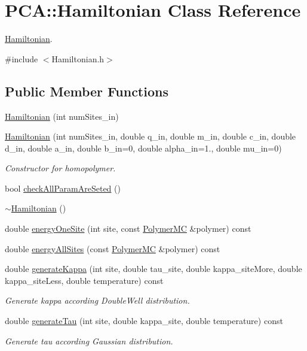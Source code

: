 \hypertarget{class_p_c_a_1_1_hamiltonian}{}\section{P\+CA\+:\+:Hamiltonian Class Reference}
\label{class_p_c_a_1_1_hamiltonian}


\hyperlink{class_p_c_a_1_1_hamiltonian}{Hamiltonian}.  




{\ttfamily \#include $<$Hamiltonian.\+h$>$}

\subsection*{Public Member Functions}
\begin{DoxyCompactItemize}
\item 
\hyperlink{class_p_c_a_1_1_hamiltonian_a3010d0e945bf871c22e57d530783c02a}{Hamiltonian} (int num\+Sites\+\_\+in)
\item 
\hyperlink{class_p_c_a_1_1_hamiltonian_ad2663a98cb52b4675ed01d6b911dd45a}{Hamiltonian} (int num\+Sites\+\_\+in, double q\+\_\+in, double m\+\_\+in, double c\+\_\+in, double d\+\_\+in, double a\+\_\+in, double b\+\_\+in=0, double alpha\+\_\+in=1., double mu\+\_\+in=0)
\begin{DoxyCompactList}\small\item\em Constructor for homopolymer. \end{DoxyCompactList}\item 
bool \hyperlink{class_p_c_a_1_1_hamiltonian_a3c9bddc6635c2a5a2ba0b2956126eb79}{check\+All\+Param\+Are\+Seted} ()
\item 
\hyperlink{class_p_c_a_1_1_hamiltonian_a87dcca06e1580312d8ffd4ef7fcad219}{$\sim$\+Hamiltonian} ()
\item 
double \hyperlink{class_p_c_a_1_1_hamiltonian_aaf2a99fc482ccd2ebb0dc671f1a8df5a}{energy\+One\+Site} (int site, const \hyperlink{class_p_c_a_1_1_polymer_m_c}{Polymer\+MC} \&polymer) const
\item 
double \hyperlink{class_p_c_a_1_1_hamiltonian_a0751ca31444a5de38e6e5d7d07843538}{energy\+All\+Sites} (const \hyperlink{class_p_c_a_1_1_polymer_m_c}{Polymer\+MC} \&polymer) const
\item 
double \hyperlink{class_p_c_a_1_1_hamiltonian_a89970a467d0ca05c41361fdd349a9ec7}{generate\+Kappa} (int site, double tau\+\_\+site, double kappa\+\_\+site\+More, double kappa\+\_\+site\+Less, double temperature) const
\begin{DoxyCompactList}\small\item\em Generate kappa according Double\+Well distribution. \end{DoxyCompactList}\item 
double \hyperlink{class_p_c_a_1_1_hamiltonian_a4da405a227d850e6e50c87889d4cd360}{generate\+Tau} (int site, double kappa\+\_\+site, double temperature) const
\begin{DoxyCompactList}\small\item\em Generate tau according Gaussian distribution. \end{DoxyCompactList}\end{DoxyCompactItemize}
